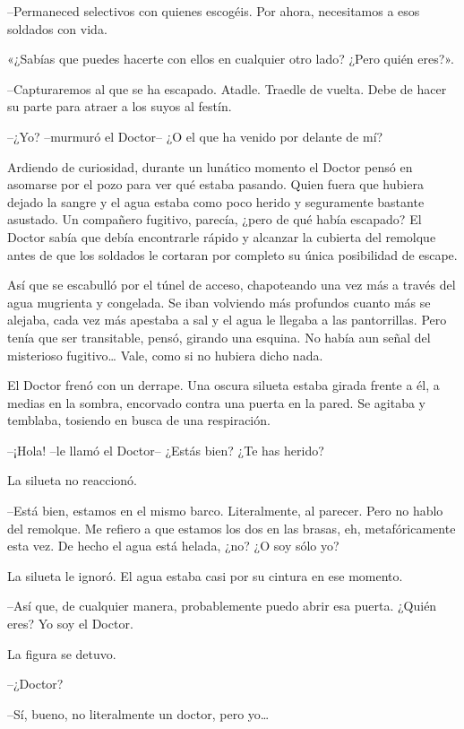 {--Permaneced selectivos con quienes escogéis. Por ahora, necesitamos a
esos soldados con vida.}

{«¿Sabías que puedes hacerte con ellos en cualquier otro lado? ¿Pero
quién eres?».}

{--Capturaremos al que se ha escapado. Atadle. Traedle de vuelta. Debe
de hacer su parte para atraer a los suyos al festín.}

{--¿Yo? --murmuró el Doctor-- ¿O el que ha venido por delante de mí?}

{Ardiendo de curiosidad, durante un lunático momento el Doctor pensó en
 asomarse por el pozo para ver qué estaba pasando. Quien fuera que
 hubiera dejado la sangre y el agua estaba como poco herido y seguramente
 bastante asustado. Un compañero fugitivo, parecía, ¿pero de qué había
 escapado? El Doctor sabía que debía encontrarle rápido y alcanzar la
 cubierta del remolque antes de que los soldados le cortaran por completo
su única posibilidad de escape.}

{Así que se escabulló por el túnel de acceso, chapoteando una vez más a
 través del agua mugrienta y congelada. Se iban volviendo más profundos
 cuanto más se alejaba, cada vez más apestaba a sal y el agua le llegaba
 a las pantorrillas. Pero tenía que ser transitable, pensó, girando una
 esquina. No había aun señal del misterioso fugitivo\ldots{} Vale, como
si no hubiera dicho nada.}

{El Doctor frenó con un derrape. Una oscura silueta estaba girada frente
 a él, a medias en la sombra, encorvado contra una puerta en la pared. Se
agitaba y temblaba, tosiendo en busca de una respiración.}

{--¡Hola! --le llamó el Doctor-- ¿Estás bien? ¿Te has herido?}

{La silueta no reaccionó.}

{--Está bien, estamos en el mismo barco. Literalmente, al parecer. Pero
 no hablo del remolque. Me refiero a que estamos los dos en las brasas,
 eh, metafóricamente esta vez. De hecho el agua está helada, ¿no? ¿O soy
sólo yo?}

{La silueta le ignoró. El agua estaba casi por su cintura en ese
momento.}

{--Así que, de cualquier manera, probablemente puedo abrir esa puerta.
¿Quién eres? Yo soy el Doctor.}

{La figura se detuvo.}

{--¿Doctor?}

{--Sí, bueno, no literalmente un doctor, pero yo\ldots{}}

